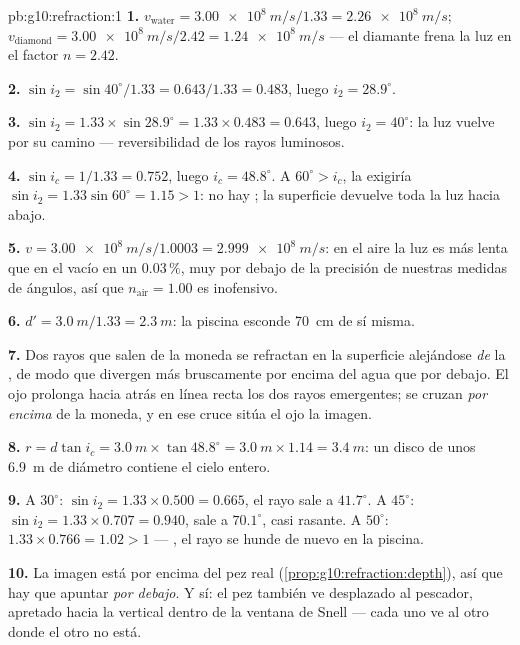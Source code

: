 \begin{solution}{pb:g10:refraction:1}
\textbf{1.} $v_{\text{water}} = \qty{3.00e8}{m/s}/1.33 =
\qty{2.26e8}{m/s}$; $v_{\text{diamond}} = \qty{3.00e8}{m/s}/2.42 =
\qty{1.24e8}{m/s}$ --- el diamante frena la luz en el factor
$n = 2.42$.

\textbf{2.} $\sin i_2 = \sin 40^\circ / 1.33 = 0.643/1.33 = 0.483$,
luego $i_2 = 28.9^\circ$.

\textbf{3.} $\sin i_2 = 1.33 \times \sin 28.9^\circ = 1.33 \times
0.483 = 0.643$, luego $i_2 = 40^\circ$: la luz vuelve por su camino ---
reversibilidad de los rayos luminosos.

\textbf{4.} $\sin i_c = 1/1.33 = 0.752$, luego $i_c = 48.8^\circ$. A
$60^\circ > i_c$, la  exigiría
$\sin i_2 = 1.33 \sin 60^\circ = 1.15 > 1$: no hay ; la
superficie devuelve toda la luz hacia abajo.

\textbf{5.} $v = \qty{3.00e8}{m/s}/1.0003 = \qty{2.999e8}{m/s}$: en el
aire la luz es más lenta que en el vacío en un $0.03\,\%$, muy por debajo
de la precisión de nuestras medidas de ángulos, así que
$n_{\text{air}} = 1.00$ es inofensivo.

\textbf{6.} $d' = \qty{3.0}{m}/1.33 = \qty{2.3}{m}$: la piscina esconde
\qty{70}{cm} de sí misma.

\textbf{7.} Dos rayos que salen de la moneda se refractan en la
superficie alejándose \emph{de} la , de modo que divergen más
bruscamente por encima del agua que por debajo. El ojo prolonga hacia
atrás en línea recta los dos rayos emergentes; se cruzan \emph{por
encima} de la moneda, y en ese cruce sitúa el ojo la imagen.

\textbf{8.} $r = d \tan i_c = \qty{3.0}{m} \times \tan 48.8^\circ =
\qty{3.0}{m} \times 1.14 = \qty{3.4}{m}$: un disco de unos \qty{6.9}{m}
de diámetro contiene el cielo entero.

\textbf{9.} A $30^\circ$: $\sin i_2 = 1.33 \times 0.500 = 0.665$, el
rayo sale a $41.7^\circ$. A $45^\circ$:
$\sin i_2 = 1.33 \times 0.707 = 0.940$, sale a $70.1^\circ$, casi
rasante. A $50^\circ$: $1.33 \times 0.766 = 1.02 > 1$ --- , el rayo se hunde de nuevo en la piscina.

\textbf{10.} La imagen está por encima del pez real
(\cref{prop:g10:refraction:depth}), así que hay que apuntar \emph{por
debajo}. Y sí: el pez también ve desplazado al pescador, apretado hacia
la vertical dentro de la ventana de Snell --- cada uno ve al otro donde
el otro no está.


\end{solution}

